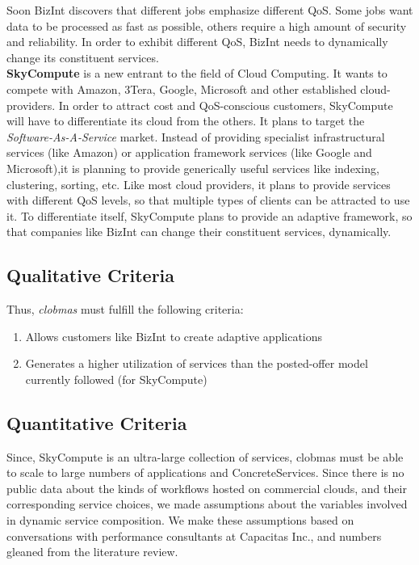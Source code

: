 \documentclass[10pt,journal,compsoc]{IEEEtran}
\begin{document}
Soon BizInt discovers that different jobs emphasize different QoS. Some jobs want data to be processed as fast as possible, others require a high amount of security and reliability. In order to exhibit different QoS, BizInt needs to dynamically change its constituent services. \\
\textbf{SkyCompute} is a new entrant to the field of Cloud Computing. It wants to compete with Amazon, 3Tera, Google, Microsoft and other established cloud-providers. In order to attract cost and QoS-conscious customers, SkyCompute will have to differentiate its cloud from the others. It plans to target the \textit{Software-As-A-Service} market. Instead of providing specialist infrastructural services (like Amazon) or application framework services (like Google and Microsoft),it is planning to provide generically useful services like indexing, clustering, sorting, etc. Like most cloud providers, it plans to provide services with different QoS levels, so that multiple types of clients can be attracted to use it. To differentiate itself, SkyCompute plans to provide an adaptive framework, so that companies like BizInt can change their constituent services, dynamically.

\subsection{Qualitative Criteria}
Thus, \textit{clobmas} must fulfill the following criteria:
\begin{enumerate}
		\item Allows customers like BizInt to create adaptive applications
		\item Generates a higher utilization of services than the posted-offer model currently followed (for SkyCompute)
	\end{enumerate}

\subsection{Quantitative Criteria}
Since, SkyCompute is an ultra-large collection of services, clobmas must be able to scale to large numbers of applications and ConcreteServices. Since there is no public data about the kinds of workflows hosted on commercial clouds, and their corresponding service choices, we made assumptions about the variables involved in dynamic service composition. We make these assumptions based on conversations with performance consultants at Capacitas Inc., and numbers gleaned from the literature review.
       	  
\end{document}
